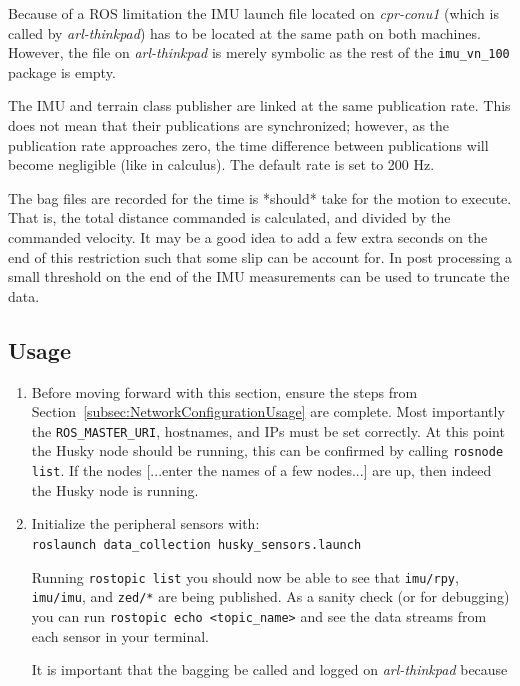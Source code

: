 \documentclass[
	12pt, %
]{fphw}
\newcommand{\code}[1]{\colorbox{light-gray}{\texttt{#1}}}
\begin{document}
Because of a ROS limitation the IMU launch file located on \emph{cpr-conu1} (which is called by \emph{arl-thinkpad}) has to be located at the same path on both machines. However, the file on \emph{arl-thinkpad} is merely symbolic as the rest of the \code{imu\_vn\_100} package is empty.

The IMU and terrain class publisher are linked at the same publication rate. This does not mean that their publications are synchronized; however, as the publication rate approaches zero, the time difference between publications will become negligible (like in calculus). The default rate is set to 200 Hz.

The bag files are recorded for the time is *should* take for the motion to execute. That is, the total distance commanded is calculated, and divided by the commanded velocity. It may be a good idea to add a few extra seconds on the end of this restriction such that some slip can be account for. In post processing a small threshold on the end of the IMU measurements can be used to truncate the data.

\subsection{Usage}

\begin{enumerate}
\item Before moving forward with this section, ensure the steps from Section~\ref{subsec:NetworkConfigurationUsage} are complete. Most importantly the \code{ROS\_MASTER\_URI}, hostnames, and IPs must be set correctly. At this point the Husky node should be running, this can be confirmed by calling \code{rosnode list}. If the nodes [...enter the names of a few nodes...] are up, then indeed the Husky node is running.
	
\item Initialize the peripheral sensors with: \\
  \code{roslaunch data\_collection husky\_sensors.launch}
  
  \qquad Running \code{rostopic list} you should now be able to see that \code{imu/rpy}, \code{imu/imu}, and \code{zed/*} are being published. As a sanity check (or for debugging) you can run \code{rostopic echo <topic\_name>} and see the data streams from each sensor in your terminal.

  It is important that the bagging be called and logged on \emph{arl-thinkpad} because

\end{enumerate}
\end{document}
